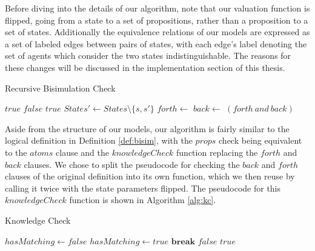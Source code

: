 Before diving into the details of our algorithm, note that our valuation function is flipped, going from a state to a set of propositions, rather than a proposition to a set of states. Additionally the equivalence relations of our models are expressed as a set of labeled edges between pairs of states, with each edge's label denoting the set of agents which consider the two states indistinguishable. The reasons for these changes will be discussed in the implementation section of this thesis.

\begin{algorithm}
\caption{Recursive Bisimulation Check}
\label{alg:rbc}
\begin{algorithmic}[H]
		\State\Return $true$
		\State\Return $false$
		\State\Return $true$
	\Else
		\State $States' \gets States \setminus \{s,s'\}$
		\State $forth \gets$ 
		\State $back \gets$ 
		\State \Return $(forth \ and \ back)$
	\EndIf
\EndFunction
\end{algorithmic}
\end{algorithm}


Aside from the structure of our models, our algorithm is fairly similar to the logical definition in Definition \ref{def:bisim}, with the $props$ check being equivalent to the $atoms$ clause and the $knowledgeCheck$ function replacing the $forth$ and $back$ clauses. We chose to split the pseudocode for checking the $back$ and $forth$ clauses of the original definition into its own function, which we then reuse by calling it twice with the state parameters flipped. The pseudocode for this $knowledgeCheck$ function is shown in Algorithm \ref{alg:kc}.

\begin{algorithm}
\caption{Knowledge Check}
\label{alg:kc}
\begin{algorithmic}
			\State $hasMatching \gets false$
					\State $hasMatching \gets true$
					\State $\mathbf{break}$
				\EndIf
			\EndFor
				\State\Return $false$
			\EndIf
		\EndFor	
	\EndFor
	\State \Return $true$ 
\EndFunction
\end{algorithmic}
\end{algorithm}

